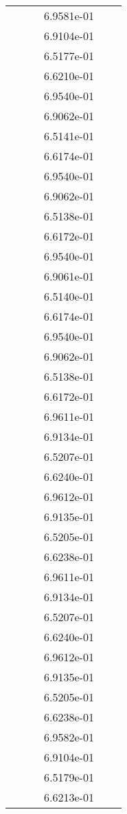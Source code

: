 \begin{xltabular}{\textwidth}{r|rS[table-format=1.3e+2]S[table-format=1.4e+2]S[table-format=1.4e+2]S[table-format=-1.5]}
&  &  & 6.9581e-01 & & \\
&  &  & 6.9104e-01 & & \\
&  &  & 6.5177e-01 & & \\
&  &  & 6.6210e-01 & & \\
&  &  & 6.9540e-01 & & \\
&  &  & 6.9062e-01 & & \\
&  &  & 6.5141e-01 & & \\
&  &  & 6.6174e-01 & & \\
&  &  & 6.9540e-01 & & \\
&  &  & 6.9062e-01 & & \\
&  &  & 6.5138e-01 & & \\
&  &  & 6.6172e-01 & & \\
&  &  & 6.9540e-01 & & \\
&  &  & 6.9061e-01 & & \\
&  &  & 6.5140e-01 & & \\
&  &  & 6.6174e-01 & & \\
&  &  & 6.9540e-01 & & \\
&  &  & 6.9062e-01 & & \\
&  &  & 6.5138e-01 & & \\
&  &  & 6.6172e-01 & & \\
&  &  & 6.9611e-01 & & \\
&  &  & 6.9134e-01 & & \\
&  &  & 6.5207e-01 & & \\
&  &  & 6.6240e-01 & & \\
&  &  & 6.9612e-01 & & \\
&  &  & 6.9135e-01 & & \\
&  &  & 6.5205e-01 & & \\
&  &  & 6.6238e-01 & & \\
&  &  & 6.9611e-01 & & \\
&  &  & 6.9134e-01 & & \\
&  &  & 6.5207e-01 & & \\
&  &  & 6.6240e-01 & & \\
&  &  & 6.9612e-01 & & \\
&  &  & 6.9135e-01 & & \\
&  &  & 6.5205e-01 & & \\
&  &  & 6.6238e-01 & & \\
&  &  & 6.9582e-01 & & \\
&  &  & 6.9104e-01 & & \\
&  &  & 6.5179e-01 & & \\
&  &  & 6.6213e-01 & & \\

\end{xltabular}
